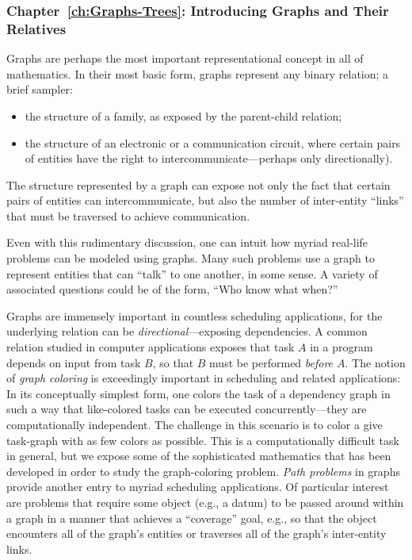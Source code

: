 \subsubsection{Chapter~\ref{ch:Graphs-Trees}: Introducing Graphs and Their Relatives}

Graphs are perhaps the most important representational concept in all
of mathematics.  In their most basic form, graphs represent any binary
relation; a brief sampler:
\begin{itemize}
\item
the structure of a family, as exposed by the parent-child relation;
\item
the structure of an electronic or a communication circuit, where
certain pairs of entities have the right to intercommunicate---perhaps
only directionally).
\end{itemize}
The structure represented by a graph can expose not only the fact that
certain pairs of entities can intercommunicate, but also the number of
inter-entity ``links'' that must be traversed to achieve
communication.

Even with this rudimentary discussion, one can intuit how myriad
real-life problems can be modeled using graphs.  Many such problems
use a graph to represent entities that can ``talk'' to one another, in
some sense.  A variety of associated questions could be of the form,
``Who know what when?''

Graphs are immensely important in countless scheduling applications,
for the underlying relation can be {\em directional}---exposing
dependencies.  A common relation studied in computer applications
exposes that task $A$ in a program depends on input from task $B$, so
that $B$ must be performed {\em before $A$}.  The notion of {\it graph
  coloring} is exceedingly important in scheduling and related
applications: In its conceptually simplest form, one colors the task
of a dependency graph in such a way that like-colored tasks can be
executed concurrently---they are computationally independent.  The
challenge in this scenario is to color a give task-graph with as few
colors as possible.  This is a computationally difficult task in
general, but we expose some of the sophisticated mathematics that has
been developed in order to study the graph-coloring problem.  {\em
  Path problems} in graphs provide another entry to myriad scheduling
applications.  Of particular interest are problems that require some
object (e.g., a datum) to be passed around within a graph in a manner
that achieves a ``coverage'' goal, e.g., so that the object encounters
all of the graph's entities or traverses all of the graph's
inter-entity links.

